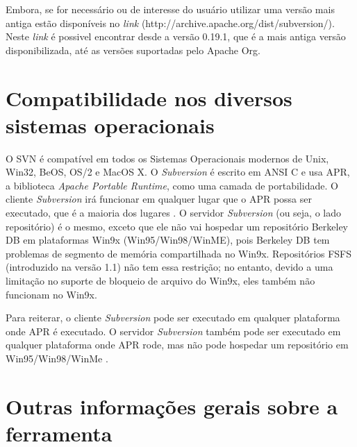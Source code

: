   Embora, se for necessário ou de interesse do usuário utilizar uma versão mais antiga estão disponíveis no \textit{link} (http://archive.apache.org/dist/subversion/). Neste \textit{link} é possivel encontrar desde a versão 0.19.1, que é a mais antiga versão disponibilizada, até as versões suportadas pelo Apache Org.

\section{Compatibilidade nos diversos sistemas operacionais}

  O SVN é compatível em todos os Sistemas Operacionais modernos de Unix, Win32, BeOS, OS/2 e MacOS X. O \textit{Subversion} é escrito em ANSI C e usa APR, a biblioteca \textit{Apache Portable Runtime}, como uma camada de portabilidade. O cliente \textit{Subversion} irá funcionar em qualquer lugar que o APR possa ser executado, que é a maioria dos lugares \cite{apache-faq}. O servidor \textit{Subversion} (ou seja, o lado repositório) é o mesmo, exceto que ele não vai hospedar um repositório Berkeley DB em plataformas Win9x (Win95/Win98/WinME), pois Berkeley DB tem problemas de segmento de memória compartilhada no Win9x. Repositórios FSFS (introduzido na versão 1.1) não tem essa restrição; no entanto, devido a uma limitação no suporte de bloqueio de arquivo do Win9x, eles também não funcionam no Win9x.

  Para reiterar, o cliente \textit{Subversion} pode ser executado em qualquer plataforma onde APR é executado. O servidor \textit{Subversion} também pode ser executado em qualquer plataforma onde APR rode, mas não pode hospedar um repositório em Win95/Win98/WinMe \cite{apache-faq}.

\section{Outras informações gerais sobre a ferramenta}
